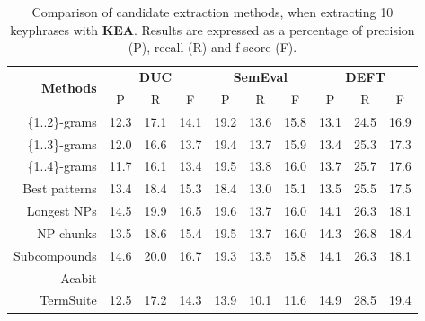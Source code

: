     \begin{table}[h]
      \centering
      \begin{tabular}{rccccccccc}
        \toprule
        \multirow{2}{*}[-2pt]{\textbf{Methods}} & \multicolumn{3}{c}{\textbf{DUC}} & \multicolumn{3}{c}{\textbf{SemEval}} & \multicolumn{3}{c}{\textbf{DEFT}}\\
        \cmidrule(r){2-4}\cmidrule(lr){5-7}\cmidrule(l){8-10}
        & P & R & F & P & R & F & P & R & F\\
        \midrule
        \{1..2\}-grams & 12.3 & 17.1 & 14.1 & 19.2 & 13.6 & 15.8 & 13.1 & 24.5 & 16.9\\
        \{1..3\}-grams & 12.0 & 16.6 & 13.7 & 19.4 & 13.7 & 15.9 & 13.4 & 25.3 & 17.3\\
        \{1..4\}-grams & 11.7 & 16.1 & 13.4 & 19.5 & 13.8 & 16.0 & 13.7 & 25.7 & 17.6\\
        Best patterns & 13.4 & 18.4 & 15.3 & 18.4 & 13.0 & 15.1 & 13.5 & 25.5 & 17.5\\
        Longest NPs & 14.5 & 19.9 & 16.5 & 19.6 & 13.7 & 16.0 & 14.1 & 26.3 & 18.1\\
        NP chunks & 13.5 & 18.6 & 15.4 & 19.5 & 13.7 & 16.0 & 14.3 & 26.8 & 18.4\\
        Subcompounds & 14.6 & 20.0 & 16.7 & 19.3 & 13.5 & 15.8 & 14.1 & 26.3 & 18.1\\
        Acabit & & & & & & & & & \\
        TermSuite & 12.5 & 17.2 & 14.3 & 13.9 & 10.1 & 11.6 & 14.9 & 28.5 & 19.4\\
        \bottomrule
      \end{tabular}
      \caption{Comparison of candidate extraction methods, when extracting 10
               keyphrases with \textbf{KEA}. Results are expressed as a
               percentage of precision (P), recall (R) and f-score (F).
               \label{tab:keyphrase_extraction_results}}
    \end{table}

